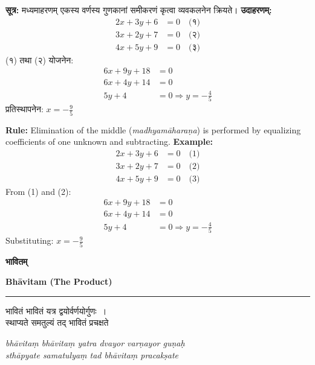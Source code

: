 \documentclass[11pt,a4paper]{article}
\newcommand{\dev}[1]{{\devanagarifont #1}}
\newcommand{\bicol}[2]{%
\noindent%
\begin{minipage}[t]{0.48\textwidth}
\begin{flushleft}
\small
#1
\end{flushleft}
\end{minipage}%
\hfill%
\begin{minipage}[t]{0.48\textwidth}
\begin{flushleft}
\small
#2
\end{flushleft}
\end{minipage}%
\vspace{0.4em}
}
\newcommand{\bicolverse}[2]{%
\par\noindent%
\begin{minipage}[t]{0.48\textwidth}
\centering
\color{versecolor}
\devanagarifont
\small
#1
\end{minipage}%
\hfill%
\begin{minipage}[t]{0.48\textwidth}
\centering
\color{versecolor}
\small
#2
\end{minipage}%
\par\vspace{0.4em}
}
\newcommand{\sectionbicol}[2]{%
\vspace{0.5em}
\noindent%
\begin{minipage}[t]{0.48\textwidth}
\begin{center}
\large\bfseries\color{sectioncolor}
\dev{#1}
\end{center}
\end{minipage}%
\hfill%
\begin{minipage}[t]{0.48\textwidth}
\begin{center}
\large\bfseries\color{sectioncolor}
#2
\end{center}
\end{minipage}%
\vspace{0.3em}
\noindent\rule{\textwidth}{0.4pt}
}
\begin{document}
\bicol{%
\textbf{सूत्र:} मध्यमाहरणम् एकस्य वर्णस्य गुणकानां समीकरणं कृत्वा व्यवकलनेन क्रियते।
\vspace{0.3cm}
\textbf{उदाहरणम्:}
\begin{align*}
2x + 3y + 6 &= 0 \quad \text{(१)} \\
3x + 2y + 7 &= 0 \quad \text{(२)} \\
4x + 5y + 9 &= 0 \quad \text{(३)}
\end{align*}
(१) तथा (२) योजनेन:
\begin{align*}
6x + 9y + 18 &= 0 \\
6x + 4y + 14 &= 0 \\
5y + 4 &= 0 \Rightarrow y = -\tfrac{4}{5}
\end{align*}
प्रतिस्थापनेन: $x = -\tfrac{9}{5}$
}{%
\textbf{Rule:} Elimination of the middle (\textit{madhyam\={a}hara\d{n}a}) is performed by equalizing coefficients of one unknown and subtracting.
\vspace{0.3cm}
\textbf{Example:}
\begin{align*}
2x + 3y + 6 &= 0 \quad \text{(1)} \\
3x + 2y + 7 &= 0 \quad \text{(2)} \\
4x + 5y + 9 &= 0 \quad \text{(3)}
\end{align*}
From (1) and (2):
\begin{align*}
6x + 9y + 18 &= 0 \\
6x + 4y + 14 &= 0 \\
5y + 4 &= 0 \Rightarrow y = -\tfrac{4}{5}
\end{align*}
Substituting: $x = -\tfrac{9}{5}$
}

\clearpage

\sectionbicol{भावितम्}{Bh\={a}vitam (The Product)}

\vspace{0.3cm}

\bicolverse{%
भावितं भावितं यत्र द्वयोर्वर्णयोर्गुणः~।\\
स्थाप्यते समतुल्यं तद् भावितं प्रचक्षते~
}{%
\textit{bh\={a}vita\d{m} bh\={a}vita\d{m} yatra dvayor var\d{n}ayor gu\d{n}a\d{h}}\\
\textit{sth\={a}pyate samatulya\d{m} tad bh\={a}vita\d{m} pracak\d{s}ate}
}

\vspace{0.5cm}
\end{document}
